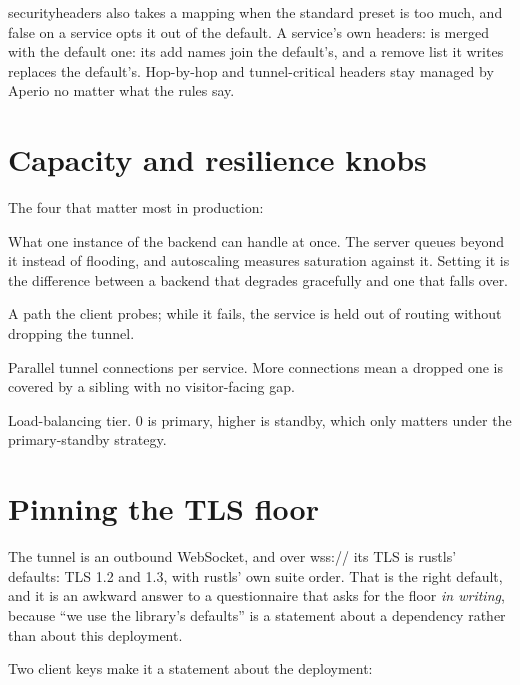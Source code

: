 \documentclass[11pt,a4paper,oneside]{book}
\newcommand{\aperiobreakableunderscore}{\textunderscore\allowbreak}
\newcommand{\aperiocodebreaks}{\XeTeXinterchartokenstate=1 }
\newcommand{\aperiocodebreaks}{}
\DeclareRobustCommand{\code}[1]{{\ttfamily\small\aperiocodebreaks
  \let\_\aperiobreakableunderscore#1}}
\begin{document}
\code{security\_headers} also takes a mapping when the standard preset is
too much, and \code{false} on a service opts it out of the default. A
service's own \code{headers:} is merged with the default one: its
\code{add} names join the default's, and a \code{remove} list it writes
replaces the default's. Hop-by-hop and tunnel-critical headers stay managed by Aperio no
matter what the rules say.

\section{Capacity and resilience knobs}

The four that matter most in production:

\begin{description}[leftmargin=1.6em,style=nextline]
  \item[\code{limits.concurrent\_requests}] What one instance of the backend can
        handle at once. The server queues beyond it instead of flooding,
        and autoscaling measures saturation against it. Setting it is the
        difference between a backend that degrades gracefully and one
        that falls over.
  \item[\code{health.endpoint}] A path the client probes; while it fails,
        the service is held out of routing without dropping the tunnel.
  \item[\code{connections}] Parallel tunnel connections per service. More
        connections mean a dropped one is covered by a sibling with no
        visitor-facing gap.
  \item[\code{priority}] Load-balancing tier. \code{0} is primary, higher
        is standby, which only matters under the primary-standby strategy.
\end{description}

\section{Pinning the TLS floor}

The tunnel is an outbound WebSocket, and over \code{wss://} its TLS is
rustls' defaults: TLS 1.2 and 1.3, with rustls' own suite order. That is the
right default, and it is an awkward answer to a questionnaire that asks for
the floor \emph{in writing}, because ``we use the library's defaults'' is a
statement about a dependency rather than about this deployment.

Two client keys make it a statement about the deployment:
\end{document}
